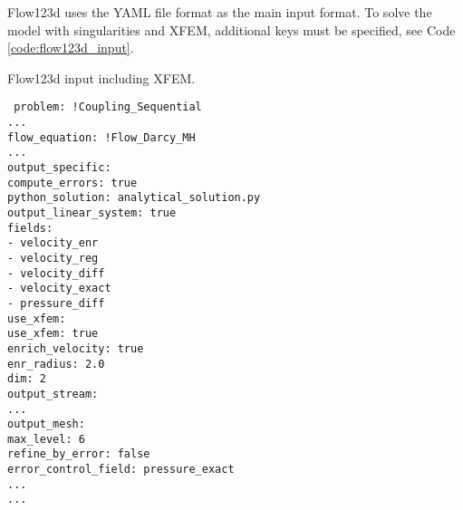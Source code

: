 Flow123d uses the YAML file format as the main input format. To solve the model with singularities and XFEM, additional
keys must be specified, see Code \ref{code:flow123d_input}. 
%
\begin{code}
\caption{Flow123d input including XFEM.}
\label{code:flow123d_input}
\texttt{
problem: !Coupling\_Sequential \\
\mbox{}\phantom{mm} ... \\
\mbox{}\phantom{mm}    flow\_equation: !Flow\_Darcy\_MH \\
\mbox{}\phantom{mmmm}        ... \\
\mbox{}\phantom{mmmm}        output\_specific: \\
\mbox{}\phantom{mmmmmm}            compute\_errors: true \\
\mbox{}\phantom{mmmmmm}            python\_solution: analytical\_solution.py \\
\mbox{}\phantom{mmmmmm}            output\_linear\_system: true \\
\mbox{}\phantom{mmmmmm}            fields: \\
\mbox{}\phantom{mmmmmmmm}             - velocity\_enr \\
\mbox{}\phantom{mmmmmmmm}             - velocity\_reg \\
\mbox{}\phantom{mmmmmmmm}             - velocity\_diff \\
\mbox{}\phantom{mmmmmmmm}             - velocity\_exact \\
\mbox{}\phantom{mmmmmmmm}             - pressure\_diff \\
\mbox{}\phantom{mmmm}        use\_xfem: \\
\mbox{}\phantom{mmmmmm}            use\_xfem: true \\
\mbox{}\phantom{mmmmmm}            enrich\_velocity: true \\
\mbox{}\phantom{mmmmmm}            enr\_radius: 2.0 \\
\mbox{}\phantom{mmmmmm}            dim: 2 \\
\mbox{}\phantom{mmmm}       output\_stream: \\
\mbox{}\phantom{mmmmmm}         ... \\
\mbox{}\phantom{mmmmmm}         output\_mesh: \\
\mbox{}\phantom{mmmmmmmm}        max\_level: 6 \\
\mbox{}\phantom{mmmmmmmm}        refine\_by\_error: false \\
\mbox{}\phantom{mmmmmmmm}        error\_control\_field: pressure\_exact \\
\mbox{}\phantom{mmmm}        ... \\
\mbox{}\phantom{mm} ...}
\end{code}
